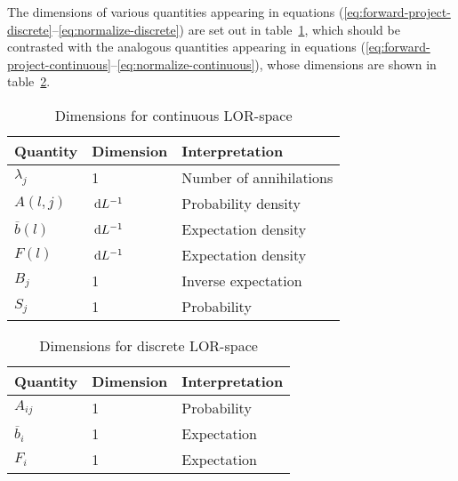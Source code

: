 \documentclass[10pt, a4paper, twocolumn]{article} %
\newcommand\dd[1]  { \,\textrm d{#1} }   %
\begin{document}
The dimensions of various quantities appearing in equations
(\ref{eq:forward-project-discrete}--\ref{eq:normalize-discrete}) are set out in
table~\ref{tab:dimensions-continuous}, which should be contrasted with the
analogous quantities appearing in equations
(\ref{eq:forward-project-continuous}--\ref{eq:normalize-continuous}), whose
dimensions are shown in table~\ref{tab:dimensions-discrete}.


\begin{table}
  \centering
  \begin{tabular}{lll}
  \toprule
  Quantity & Dimension & Interpretation \\
  \midrule
  \(\lambda_{j}\)       & 1              & Number of annihilations \\
  \(A(l,j)\)           &  \(\dd L^{-1}\) & Probability density     \\
  \(\overline{b}(l)\)  &  \(\dd L^{-1}\) & Expectation density     \\
  \(F(l)\)             &  \(\dd L^{-1}\) & Expectation density     \\
  \(B_{j}\)            &  1              & Inverse expectation     \\
  \(S_{j}\)            &  1              & Probability             \\
  \bottomrule
  \end{tabular}
  \caption{Dimensions for continuous LOR-space}\label{tab:dimensions-continuous}
\end{table}

\begin{table}
  \centering
  \begin{tabular}{lll}
  \toprule
  Quantity & Dimension & Interpretation \\
  \midrule
  \(A_{ij}\)            & 1 & Probability \\
  \(\overline{b}_{i}\)  & 1 & Expectation \\
  \(F_{i}\)             & 1 & Expectation \\
  \bottomrule
  \end{tabular}
  \caption{Dimensions for discrete LOR-space}\label{tab:dimensions-discrete}
\end{table}
\end{document}
